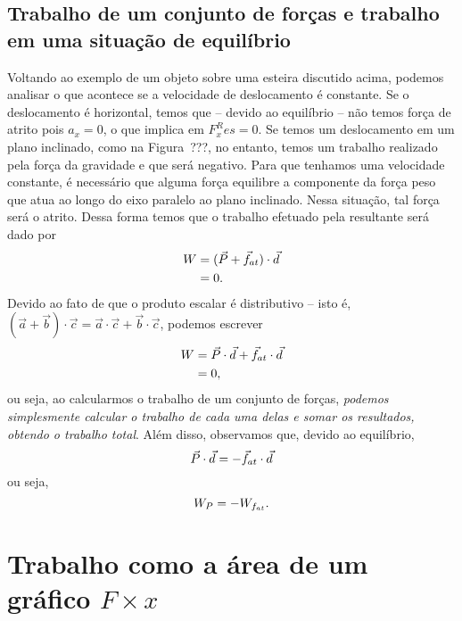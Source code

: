 \subsection{Trabalho de um conjunto de forças e trabalho em uma situação de equilíbrio}

Voltando ao exemplo de um objeto sobre uma esteira discutido acima, podemos analisar o que acontece se a velocidade de deslocamento é constante. Se o deslocamento é horizontal, temos que -- devido ao equilíbrio -- não temos força de atrito 
pois $a_x = 0$, o que implica em $F_x^Res = 0$. Se temos um deslocamento em um plano inclinado, como na Figura~???,  no entanto, temos um trabalho realizado pela força da gravidade e que será negativo. Para que tenhamos uma velocidade constante, é necessário que alguma força equilibre a componente da força peso que atua ao longo do eixo paralelo ao plano inclinado. Nessa situação, tal força será o atrito. Dessa forma temos que o trabalho efetuado pela resultante será dado por
\begin{align}
  W &= (\vec{P} + \vec{f}_{at}) \cdot \vec{d} \\
  &= 0.
\end{align}
%
Devido ao fato de que o produto escalar é distributivo -- isto é, $(\vec{a} + \vec{b})\cdot \vec{c} = \vec{a}\cdot\vec{c} + \vec{b}\cdot\vec{c}$, podemos escrever
\begin{align}
  W &= \vec{P}\cdot\vec{d} + \vec{f}_{at}\cdot\vec{d}\\
  &= 0,
\end{align}
%
ou seja, ao calcularmos o trabalho de um conjunto de forças, \emph{podemos simplesmente calcular o trabalho de cada uma delas e somar os resultados, obtendo o trabalho total}. Além disso, observamos que, devido ao equilíbrio,
\begin{equation}
  \vec{P}\cdot\vec{d} = - \vec{f}_{at}\cdot\vec{d}
\end{equation}
%
ou seja,
\begin{equation}
  W_P = - W_{f_{at}}.
\end{equation}

\section{Trabalho como a área de um gráfico $F \times x$}

